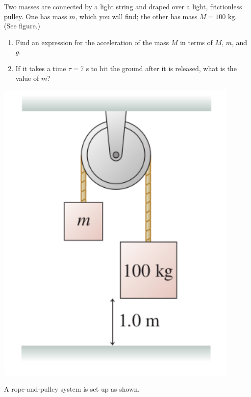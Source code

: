 \documentclass[12pt]{article}
\begin{document}
\begin{enumerate}
\bigskip

  \begin{minipage}{0.7\textwidth}
\item Two masses are connected by a light string and draped over a light, frictionless pulley. One has mass $m$, which you will find; the other has mass $M=100$ kg. (See figure.)
   
\begin{enumerate}
\item Find an expression for the acceleration of the mass $M$ in terms of $M$, $m$,
and $g$.
\item If it takes a time $\tau=7$ s to hit the ground after it is released, what is
the value of $m$? 
\end{enumerate}
  \end{minipage}
  \begin{minipage}{0.3\textwidth}
\centerline{\includegraphics[width=0.9\textwidth]{problem738.png}}
  \end{minipage}


\bigskip

  \begin{minipage}{0.6\textwidth}
\item A rope-and-pulley system is set up as shown.
   

\end{minipage}
\end{enumerate}
\end{document}
